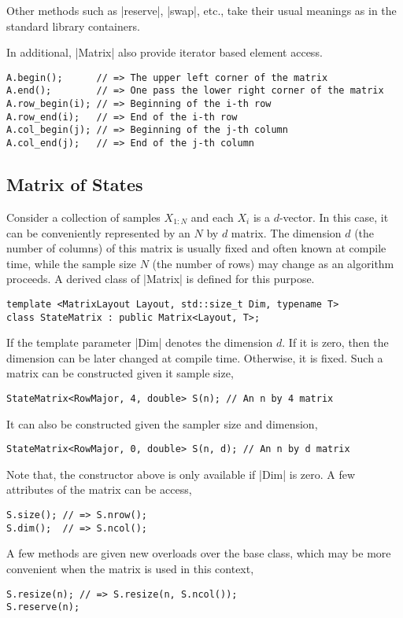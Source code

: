Other methods such as |reserve|, |swap|, etc., take their usual meanings as in
the standard library containers.

In additional, |Matrix| also provide iterator based element access.
\begin{verbatim}
A.begin();      // => The upper left corner of the matrix
A.end();        // => One pass the lower right corner of the matrix
A.row_begin(i); // => Beginning of the i-th row
A.row_end(i);   // => End of the i-th row
A.col_begin(j); // => Beginning of the j-th column
A.col_end(j);   // => End of the j-th column
\end{verbatim}

\subsection{Matrix of States}
\label{sub:Matrix of States}

Consider a collection of samples $X_{1:N}$ and each $X_i$ is a $d$-vector. In
this case, it can be conveniently represented by an $N$ by $d$ matrix. The
dimension $d$ (the number of columns) of this matrix is usually fixed and often
known at compile time, while the sample size $N$ (the number of rows) may
change as an algorithm proceeds. A derived class of |Matrix| is defined for
this purpose.
\begin{verbatim}
template <MatrixLayout Layout, std::size_t Dim, typename T>
class StateMatrix : public Matrix<Layout, T>;
\end{verbatim}
If the template parameter |Dim| denotes the dimension $d$. If it is zero, then
the dimension can be later changed at compile time. Otherwise, it is fixed.
Such a matrix can be constructed given it sample size,
\begin{verbatim}
StateMatrix<RowMajor, 4, double> S(n); // An n by 4 matrix
\end{verbatim}
It can also be constructed given the sampler size and dimension,
\begin{verbatim}
StateMatrix<RowMajor, 0, double> S(n, d); // An n by d matrix
\end{verbatim}
Note that, the constructor above is only available if |Dim| is zero. A few
attributes of the matrix can be access,
\begin{verbatim}
S.size(); // => S.nrow();
S.dim();  // => S.ncol();
\end{verbatim}
A few methods are given new overloads over the base class, which may be more
convenient when the matrix is used in this context,
\begin{verbatim}
S.resize(n); // => S.resize(n, S.ncol());
S.reserve(n);
\end{verbatim}

